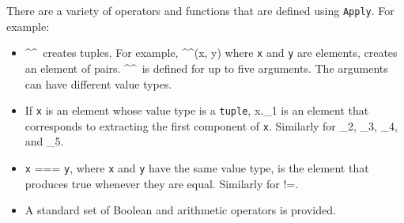 








There are a variety of operators and functions that are defined using \texttt{Apply}. For example:
\begin{itemize}
\item \textasciicircum \textasciicircum \ creates tuples. For example, \textasciicircum \textasciicircum(x, y) where \texttt{x} and \texttt{y} are elements, creates an element of pairs. \textasciicircum \textasciicircum \ is defined for up to five arguments. The arguments can have different value types.
\item If \texttt{x} is an element whose value type is a \texttt{tuple}, x.\_1 is an element that corresponds to extracting the first component of \texttt{x}. Similarly for \_2, \_3, \_4, and \_5.
\item \texttt{x} === \texttt{y}, where \texttt{x} and \texttt{y} have the same value type, is the element that produces true whenever they are equal. Similarly for !=.
\item A standard set of Boolean and arithmetic operators is provided.
\end{itemize}

